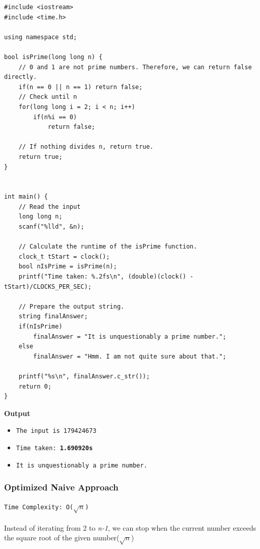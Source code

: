 \documentclass[12pt]{article}
\begin{document}
\begin{verbatim}
#include <iostream>
#include <time.h>

using namespace std;

bool isPrime(long long n) {
    // 0 and 1 are not prime numbers. Therefore, we can return false directly.
    if(n == 0 || n == 1) return false;
    // Check until n
    for(long long i = 2; i < n; i++)
        if(n%i == 0)
            return false;
    
    // If nothing divides n, return true.
    return true;
}


int main() {
    // Read the input
    long long n;
    scanf("%lld", &n);
    
    // Calculate the runtime of the isPrime function.
    clock_t tStart = clock();
    bool nIsPrime = isPrime(n);
    printf("Time taken: %.2fs\n", (double)(clock() - tStart)/CLOCKS_PER_SEC);
    
    // Prepare the output string.
    string finalAnswer;
    if(nIsPrime)
        finalAnswer = "It is unquestionably a prime number.";
    else
        finalAnswer = "Hmm. I am not quite sure about that.";
    
    printf("%s\n", finalAnswer.c_str());
    return 0;
}
\end{verbatim}
\clearpage
\textbf{Output}
\begin{itemize}
  \item \texttt{The input is 179424673} 
  \item \texttt{Time taken: \textbf{1.690920s}} 
  \item \texttt{It is unquestionably a prime number.} 
\end{itemize}

\subsubsection{Optimized Naive Approach}
\texttt{Time Complexity: O($\sqrt{n}$)} \\ \\
Instead of iterating from 2 to \textit{n-1}, we can stop when the current number exceeds the square root of the given number($\sqrt{n}$) 
\end{document}
